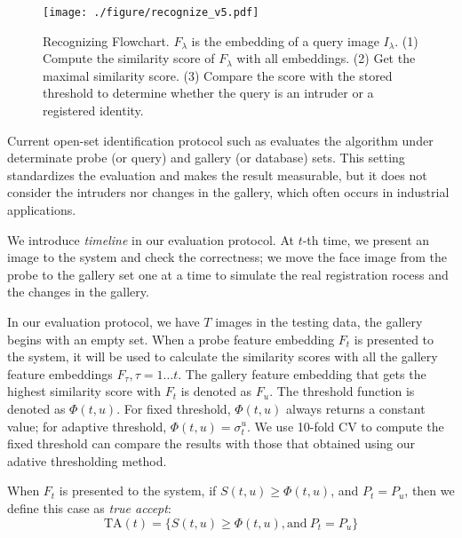 \documentclass[10pt,twocolumn]{article}
\begin{document}
\begin{figure}[t]
\centering
\texttt{[image: ./figure/recognize\_v5.pdf]}
\caption{Recognizing Flowchart. $F_{\lambda}$ is the embedding of a query image $I_{\lambda}$. (1) Compute the similarity score of $F_{\lambda}$ with all embeddings. (2) Get the maximal similarity score. (3) Compare the score with the stored threshold to determine whether the query is an intruder or a registered identity.}
\label{fig:recognition}
\end{figure}

\vspace{-12pt}
Current open-set identification protocol such as \cite{Klare_2015_CVPR} evaluates the algorithm under determinate probe (or query) and gallery (or database) sets. This setting standardizes the evaluation and makes the result measurable, but it does not consider the intruders nor changes in the gallery, which often occurs in industrial applications. 

We introduce \textit{timeline} in our evaluation protocol. At $t$-th time, we present an image to the system and check the correctness; we move the face image from the probe to the gallery set one at a time to simulate the real registration rocess and the changes in the gallery.




In our evaluation protocol, we have $T$ images in the testing data, the gallery begins with an empty set. When a probe feature embedding $F_{t}$ is presented to the system, it will be used to calculate the similarity scores with all the gallery feature embeddings $F_{\tau}, \tau=1 \dots t$. The gallery feature embedding that gets the highest similarity score with $F_{t}$ is denoted as $F_{u}$. The threshold function is denoted as $\Phi(t,u)$. For fixed threshold, $\Phi(t,u)$ always returns a constant value; for adaptive threshold, $\Phi(t,u)=\sigma_{t}^{u}$.
We use 10-fold CV to compute the fixed threshold can compare the results with those that obtained using our adative thresholding method.

When $F_{t}$ is presented to the system, if $S(t,u) \geq \Phi(t,u)$, and $P_{t}=P_{u}$, then we define this case as \textit{true accept}:
\begin{equation}
\mathrm{TA}(t) = \{S(t,u) \geq \Phi(t,u), \mathrm{and} \: P_{t}=P_{u} \}
\end{equation}
\end{document}
